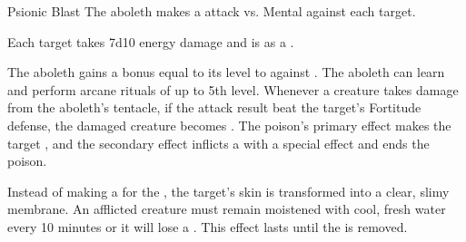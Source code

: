     \begin{freeability}{Psionic Blast}
       The aboleth makes a  attack
        vs. Mental against each target.
    
    \hit Each target takes 7d10 energy damage and is  as a .
    \end{freeability}
  
       The aboleth gains a bonus equal to its level to  against .
     The aboleth can learn and perform arcane rituals of up to 5th level.
        Whenever a creature takes damage from the aboleth's tentacle,
          if the attack result beat the target's Fortitude defense,
          the damaged creature becomes .
        The poison's primary effect makes the target ,
          and the secondary effect inflicts a  with a special effect and ends the poison.

        Instead of making a  for the ,
          the target's skin is transformed into a clear, slimy membrane.
        An afflicted creature must remain moistened with cool, fresh water every 10 minutes
          or it will lose a .
        This effect lasts until the  is removed.
  
